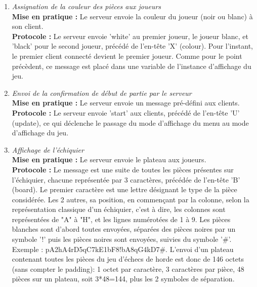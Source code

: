 \documentclass[10pt, a4paper]{article}
\begin{document}
\begin{enumerate}
\item \textit{Assignation de la couleur des pièces aux joueurs} \\
\textbf{Mise en pratique :} Le serveur envoie la couleur du joueur (noir ou blanc) à son client. \\
\textbf{Protocole :} Le serveur envoie 'white' au premier joueur, le joueur blanc, et 'black' pour le second joueur, précédé de l'en-tête 'X' (colour). Pour l'instant, le premier client connecté devient le premier joueur.  Comme pour le point précèdent, ce message est placé dans une variable de l'instance d'affichage du jeu.


\item \textit{Envoi de la confirmation de début de partie par le serveur}\\
\textbf{Mise en pratique :} Le serveur envoie un message pré-défini aux clients.\\
\textbf{Protocole :} Le serveur envoie 'start' aux clients, précédé de l'en-tête 'U' (update), ce qui déclenche le passage du mode d'affichage du menu au mode d'affichage du jeu.

\newpage

\item \textit{Affichage de l'échiquier} \\
\textbf{Mise en pratique :} Le serveur envoie le plateau aux joueurs. \\
\textbf{Protocole :} Le message est une suite de toutes les pièces présentes sur l'échiquier, chacune représentée par 3 caractères, précédée de l'en-tête 'B' (board). Le premier caractère est une lettre désignant le type de la pièce considérée. Les 2 autres, sa position, en commençant par la colonne, selon la représentation classique d'un échiquier, c'est à dire, les colonnes sont représentées de "A" à "H", et les lignes numérotées de 1 à 9. Les pièces blanches sont d'abord toutes envoyées, séparées des pièces noires par un symbole '!' puis les pièces noires sont envoyées, suivies du symbole '\#'. Exemple : pA2hA4rD5qC7kE1bF8!bA8qG4kD7\#. L'envoi d'un plateau contenant toutes les pièces du jeu d'échecs de horde est donc de 146 octets (sans compter le padding): 1 octet par caractère, 3 caractères par pièce, 48 pièces sur un plateau, soit 3*48=144, plus les 2 symboles de séparation.
\label{send_board}


\end{enumerate}
\end{document}
